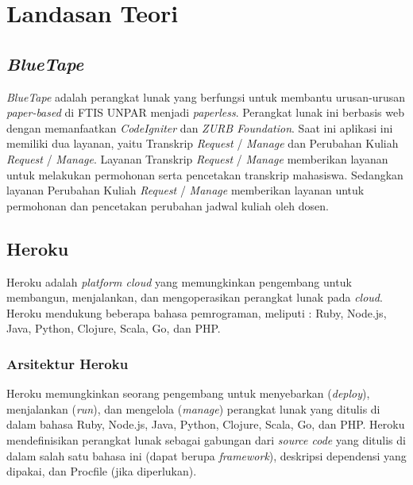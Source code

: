 
\chapter{Landasan Teori}
\label{chap:teori}
\setcounter{secnumdepth}{3}



\section{\textit{BlueTape}}
\label{sec:BlueTape}
\textit{BlueTape} adalah perangkat lunak yang berfungsi untuk membantu urusan-urusan \textit{paper-based} di FTIS UNPAR menjadi \textit{paperless}. Perangkat lunak ini berbasis web dengan memanfaatkan \textit{CodeIgniter} dan \textit{ZURB Foundation}. Saat ini aplikasi ini memiliki dua layanan, yaitu Transkrip \textit{Request} / \textit{Manage} dan Perubahan Kuliah \textit{Request} / \textit{Manage}. Layanan Transkrip \textit{Request} / \textit{Manage} memberikan layanan untuk melakukan permohonan serta pencetakan transkrip mahasiswa. Sedangkan layanan Perubahan Kuliah \textit{Request} / \textit{Manage} memberikan layanan untuk permohonan dan pencetakan perubahan jadwal kuliah oleh dosen. \footnotemark
{}



\section{Heroku ~\cite{heroku}}
\label{sec:Heroku}
Heroku adalah \textit{platform cloud} yang memungkinkan pengembang untuk membangun, menjalankan, dan mengoperasikan perangkat lunak pada \textit{cloud}. Heroku mendukung beberapa bahasa pemrograman, meliputi : Ruby, Node.js, Java, Python, Clojure, Scala, Go, dan PHP. 

\subsection{Arsitektur Heroku}
Heroku memungkinkan seorang pengembang untuk menyebarkan (\textit{deploy}), menjalankan (\textit{run}), dan mengelola (\textit{manage}) perangkat lunak yang ditulis di dalam bahasa Ruby, Node.js, Java, Python, Clojure, Scala, Go, dan PHP. Heroku mendefinisikan perangkat lunak sebagai gabungan dari \textit{source code} yang ditulis di dalam salah satu bahasa ini (dapat berupa \textit{framework}), deskripsi dependensi yang dipakai, dan Procfile (jika diperlukan).

